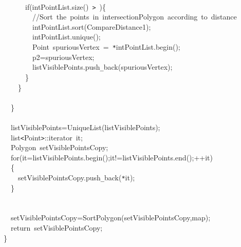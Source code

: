 \documentclass[a4paper,10pt]{article}
\begin{document}
{\jttstylea \\
\jttstylea ~~~~~~\jttstylee if\jttstylei (\jttstylek intPointList.size\jttstylei ()~\jttstylek \verb#>#~\jttstylei )\{\\
\jttstylea ~~~~~~~~\jttstyled //Sort~the~points~in~intersectionPolygon~according~to~distance\\
\jttstylea ~~~~~~~~\jttstylek intPointList.sort\jttstylei (\jttstylek CompareDistance1\jttstylei )\jttstylek ;\\
\jttstylea ~~~~~~~~\jttstylek intPointList.unique\jttstylei ()\jttstylek ;\\
\jttstylea ~~~~~~~~\jttstylek Point~spuriousVertex~=~\verb#*#intPointList.begin\jttstylei ()\jttstylek ;\\
\jttstylea ~~~~~~~~\jttstylek p2=spuriousVertex;\\
\jttstylea ~~~~~~~~\jttstylek listVisiblePoints.push\verb#_#back\jttstylei (\jttstylek spuriousVertex\jttstylei )\jttstylek ;\\
\jttstylea ~~~~~~\jttstylei \}\\
\jttstylea ~~~~\jttstylei \}\\
\jttstylea \\
\jttstylea ~~\jttstylei \}\\
\jttstylea \\
\jttstylea ~~\jttstylek listVisiblePoints=UniqueList\jttstylei (\jttstylek listVisiblePoints\jttstylei )\jttstylek ;\\
\jttstylea ~~\jttstylek list\verb#<#Point\verb#>#::iterator~it;\\
\jttstylea ~~\jttstylek Polygon~setVisiblePointsCopy;\\
\jttstylea ~~\jttstylee for\jttstylei (\jttstylek it=listVisiblePoints.begin\jttstylei ()\jttstylek ;it!=listVisiblePoints.end\jttstylei ()\jttstylek ;++it\jttstylei )\\
\jttstylea ~~\jttstylei \{\\
\jttstylea ~~~~\jttstylek setVisiblePointsCopy.push\verb#_#back\jttstylei (\jttstylek \verb#*#it\jttstylei )\jttstylek ;\\
\jttstylea ~~\jttstylei \}\\
\jttstylea \\
\jttstylea \\
\jttstylea ~~\jttstylek setVisiblePointsCopy=SortPolygon\jttstylei (\jttstylek setVisiblePointsCopy,map\jttstylei )\jttstylek ;\\
\jttstylea ~~\jttstylee return~\jttstylek setVisiblePointsCopy;\\
\jttstylei \}\\
\jttstylea \jttstylea 
\\

}
\end{document}
